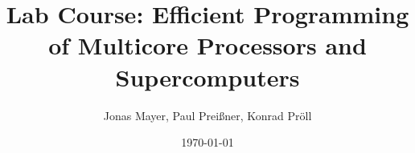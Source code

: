 \title{Lab Course: Efficient Programming of Multicore Processors and Supercomputers}
\author{Jonas Mayer, Paul Prei{\ss}ner, Konrad Pr\"oll}
\date{\today}
